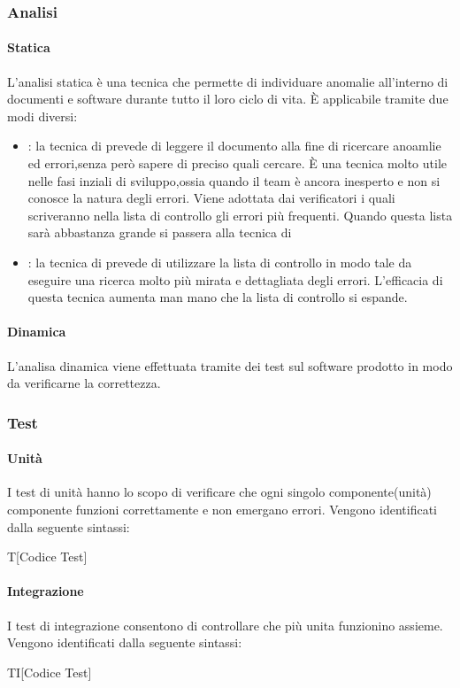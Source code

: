 \begin{itemize}
 \subsubsection{Analisi}
	\paragraph{Statica}
	L'analisi statica è una tecnica che permette di individuare anomalie all'interno di documenti e software durante tutto il loro ciclo di vita. È applicabile tramite due modi diversi:
	\begin{itemize}
		\item \texttt{}: la tecnica di prevede di leggere il documento alla fine di ricercare anoamlie ed errori,senza però sapere di preciso quali cercare. È una tecnica molto utile nelle fasi inziali di sviluppo,ossia quando il team è ancora inesperto e non si conosce la natura degli errori. Viene adottata dai verificatori i quali scriveranno nella lista di controllo gli errori più frequenti. Quando questa lista sarà abbastanza grande si passera alla tecnica di 
		\item \texttt{}: la tecnica di  prevede di utilizzare la lista di controllo in modo tale da eseguire una ricerca molto più mirata e dettagliata degli errori. L'efficacia di questa tecnica aumenta man mano che la lista di controllo si espande.
	\end{itemize}
	\paragraph{Dinamica}
	L'analisa dinamica viene effettuata tramite dei test sul software prodotto in modo da verificarne la correttezza.
 
 \subsubsection{Test}
	\paragraph{Unità}
		I test di unità hanno lo scopo di verificare che ogni singolo componente(unità) componente funzioni correttamente e non emergano errori.
		Vengono identificati dalla seguente sintassi:
		\centerline{T[Codice Test]}
	\paragraph{Integrazione}
		I test di integrazione consentono di controllare che più unita funzionino assieme.
		Vengono identificati dalla seguente sintassi:
		\centerline{TI[Codice Test]}

\end{itemize}
